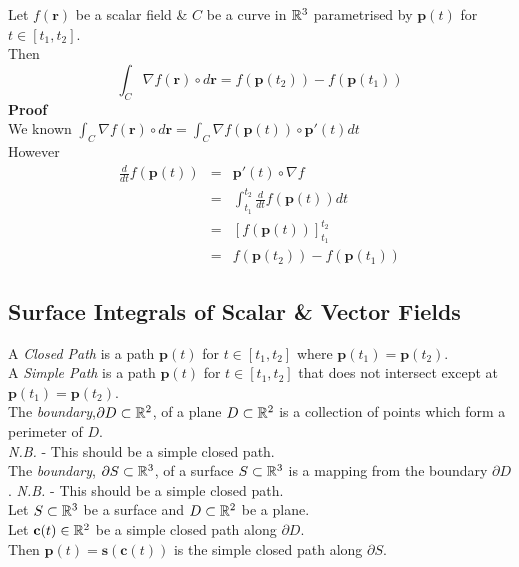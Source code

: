 \documentclass[11pt,a4paper]{article}
\begin{document}
Let $f(\textbf{r})$ be a scalar field \& $C$ be a curve in $\mathbb{R}^3$ parametrised by $\textbf{p}(t)$ for $t\in[t_1,t_2]$.\\
Then
$$\int_C\nabla f(\textbf{r})\circ d\textbf{r}=f(\textbf{p}(t_2))-f(\textbf{p}(t_1))$$
\textbf{Proof}\\
We known $\displaystyle{\int_C\nabla f(\textbf{r})\circ d\textbf{r}}=\displaystyle{\int_C\nabla f(\textbf{p}(t))\circ\textbf{p}'(t)dt}$\\
However
\[\begin{array}{rcl}
\frac{d}{dt}f(\textbf{p}(t))&=&\textbf{p}'(t)\circ\nabla f\\
&=&\int_{t_1}^{t_2}\frac{d}{dt}f(\textbf{p}(t))dt\\
&=&[f(\textbf{p}(t))]_{t_1}^{t_2}\\
&=&f(\textbf{p}(t_2))-f(\textbf{p}(t_1))
\end{array}\]

\subsection{Surface Integrals of Scalar \& Vector Fields}

A \textit{Closed Path} is a path $\textbf{p}(t)$ for $t\in[t_1,t_2]$ where $\textbf{p}(t_1)=\textbf{p}(t_2)$.\\

A \textit{Simple Path} is a path $\textbf{p}(t)$ for $t\in[t_1,t_2]$ that does not intersect except at $\textbf{p}(t_1)=\textbf{p}(t_2)$.\\

The \textit{boundary},$\partial D\subset\mathbb{R}^2$, of a plane $D\subset\mathbb{R}^2$ is a collection of points which form a perimeter of $D$.\\
\textit{N.B.} - This should be a simple closed path.\\

The \textit{boundary}, $\partial S\subset\mathbb{R}^3$, of a surface $S\subset\mathbb{R}^3$ is a mapping from the boundary $\partial D$.
\textit{N.B.} - This should be a simple closed path.\\

Let $S\subset\mathbb{R}^3$ be a surface and $D\subset\mathbb{R}^2$ be a plane.\\
Let $\textbf{c}(t)\in\mathbb{R}^2$ be a simple closed path along $\partial D$.\\
Then $\textbf{p}(t)=\textbf{s}(\textbf{c}(t))$ is the simple closed path along $\partial S$.\\
\end{document}
